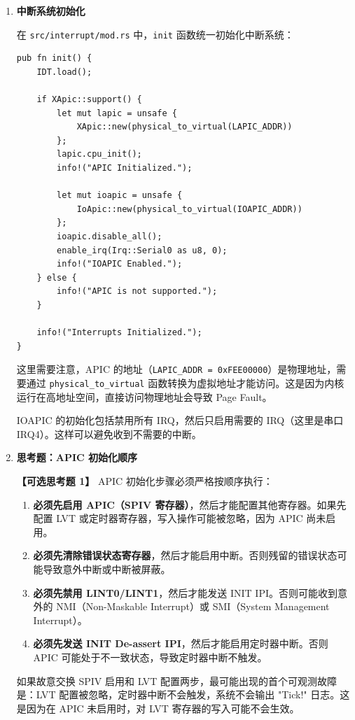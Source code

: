 \documentclass{SYSUReport}
\begin{document}
\begin{enumerate}[label={\chinese*、},labelsep=0pt, start=4]
    ICR（Interrupt Command Register）由两个 32 位寄存器组成（0x300 和 0x310）。写入 ICR 时需要先写入高 32 位（0x310），再写入低 32 位（0x300）。第 12 位（DS，Delivery Status）表示中断是否正在发送，需要等待该位清零才能进行下一次写入。

    \item \textbf{中断系统初始化}

    在 \texttt{src/interrupt/mod.rs} 中，\texttt{init} 函数统一初始化中断系统：

    \begin{verbatim}
pub fn init() {
    IDT.load();

    if XApic::support() {
        let mut lapic = unsafe {
            XApic::new(physical_to_virtual(LAPIC_ADDR))
        };
        lapic.cpu_init();
        info!("APIC Initialized.");

        let mut ioapic = unsafe {
            IoApic::new(physical_to_virtual(IOAPIC_ADDR))
        };
        ioapic.disable_all();
        enable_irq(Irq::Serial0 as u8, 0);
        info!("IOAPIC Enabled.");
    } else {
        info!("APIC is not supported.");
    }
    
    info!("Interrupts Initialized.");
}
    \end{verbatim}

    这里需要注意，APIC 的地址（\texttt{LAPIC\_ADDR = 0xFEE00000}）是物理地址，需要通过 \texttt{physical\_to\_virtual} 函数转换为虚拟地址才能访问。这是因为内核运行在高地址空间，直接访问物理地址会导致 Page Fault。

    IOAPIC 的初始化包括禁用所有 IRQ，然后只启用需要的 IRQ（这里是串口 IRQ4）。这样可以避免收到不需要的中断。

    \item \textbf{思考题：APIC 初始化顺序}

    \textbf{【可选思考题 1】} APIC 初始化步骤必须严格按顺序执行：

    \begin{enumerate}
        \item \textbf{必须先启用 APIC（SPIV 寄存器）}，然后才能配置其他寄存器。如果先配置 LVT 或定时器寄存器，写入操作可能被忽略，因为 APIC 尚未启用。
        \item \textbf{必须先清除错误状态寄存器}，然后才能启用中断。否则残留的错误状态可能导致意外中断或中断被屏蔽。
        \item \textbf{必须先禁用 LINT0/LINT1}，然后才能发送 INIT IPI。否则可能收到意外的 NMI（Non-Maskable Interrupt）或 SMI（System Management Interrupt）。
        \item \textbf{必须先发送 INIT De-assert IPI}，然后才能启用定时器中断。否则 APIC 可能处于不一致状态，导致定时器中断不触发。
    \end{enumerate}

    如果故意交换 SPIV 启用和 LVT 配置两步，最可能出现的首个可观测故障是：LVT 配置被忽略，定时器中断不会触发，系统不会输出 "Tick!" 日志。这是因为在 APIC 未启用时，对 LVT 寄存器的写入可能不会生效。

\end{enumerate}
\end{document}
